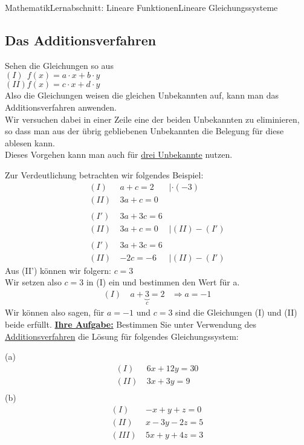 \documentclass[11pt,twocolumn,oneside,openany,headings=optiontotoc,11pt,numbers=noenddot]{article}
\begin{document}
\begin{worksheet}{Mathematik}{Lernabschnitt: Lineare Funktionen}{Lineare Gleichungssysteme}
		\subsection{Das Additionsverfahren}
		Sehen die Gleichungen so aus\\
		\((I)\ \ f(x) = a\cdot{}x + b\cdot{}y\)\\
		\((II) f(x) = c\cdot{}x + d\cdot{}y\)\\
		Also die Gleichungen weisen die gleichen Unbekannten auf, kann man das Additionsverfahren anwenden.\\
		Wir versuchen dabei in einer Zeile eine der beiden Unbekannten zu eliminieren, so dass man aus der übrig gebliebenen Unbekannten die Belegung für diese ablesen kann.\\
		Dieses Vorgehen kann man auch für \underline{drei Unbekannte} nutzen.\\
		\par\bigskip\noindent
		Zur Verdeutlichung betrachten wir folgendes Beispiel:
		\begin{align*}
			(I)\ & a + c = 2 & |\cdot(-3)\\
			(II)\ & 3a + c = 0 \\
			\\
			(I')\ & 3a + 3c = 6\\
			(II)\ & 3a + c = 0 & |(II)-(I')\\
			\\
			(I')\ & 3a + 3c = 6\\
			(II)\ & -2c = -6 & |(II)-(I')
		\end{align*}
		Aus (II') können wir folgern: \(c = 3\)\\
		Wir setzen also \(c=3\) in (I) ein und bestimmen den Wert für a.
		\begin{align*}
			(I)\ & a + \underbrace{3}_{c} = 2 & \Rightarrow a = -1
		\end{align*}
		Wir können also sagen, für \(a = -1\) und \(c = 3\) sind die Gleichungen (I) und (II) beide erfüllt.
		\newpage
		\noindent
		\textbf{\underline{Ihre Aufgabe:}} Bestimmen Sie unter Verwendung des \underline{Additionsverfahren} die Lösung für folgendes Gleichungssystem:\\
		\par\noindent
		(a)
		\begin{align*}
			(I)\ & 6x + 12y = 30\\
			(II)\ & 3x + 3y = 9\\
		\end{align*}
		\vfill
		(b)
		\begin{align*}
			(I)\ & -x + y + z = 0\\
			(II)\ & x - 3y -2z = 5\\
			(III)\ & 5x + y + 4z = 3
		\end{align*}
		\vfill
	\end{worksheet}
\end{document}
